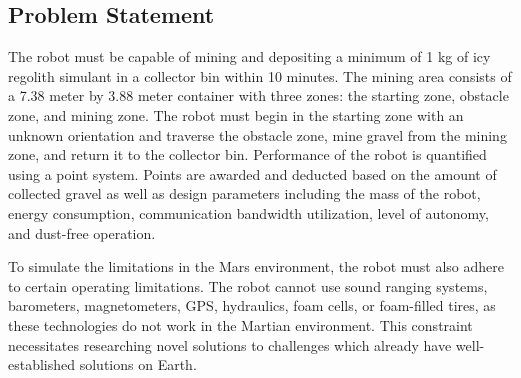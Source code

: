 \documentclass[class=article, crop=false]{standalone}
\begin{document}
	\subsection{Problem Statement}
	\label{subsec:problem_statement}
	The robot must be capable of mining and depositing a minimum of 1 kg of icy regolith simulant in a collector bin within 10 minutes. The mining area consists of a 7.38 meter by 3.88 meter container with three zones: the starting zone, obstacle zone, and mining zone. The robot must begin in the starting zone with an unknown orientation and traverse the obstacle zone, mine gravel from the mining zone, and return it to the collector bin. Performance of the robot is quantified using a point system. Points are awarded and deducted based on the amount of collected gravel as well as design parameters including  the mass of the robot, energy consumption, communication bandwidth utilization, level of autonomy, and dust-free operation.
	
	
	To simulate the limitations in the Mars environment, the robot must also adhere to certain operating limitations. The robot cannot use sound ranging systems, barometers, magnetometers, GPS, hydraulics, foam cells, or foam-filled tires, as these technologies do not work in the Martian environment. This constraint necessitates researching novel solutions to challenges which already have well-established solutions on Earth.


	
\end{document}

